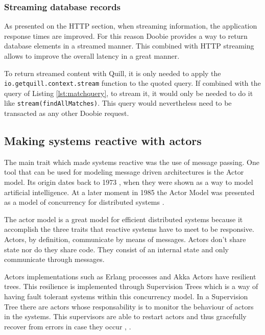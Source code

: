 \documentclass[../main.tex]{subfiles}
\begin{document}
\subsubsection{Streaming database records}
As presented on the HTTP section, when streaming information, the application
response times are improved. For this reason Doobie provides a way to return
database elements in a streamed manner. This combined with HTTP streaming allows
to improve the overall latency in a great manner.

To return streamed content with Quill, it is only needed to apply the\\
\texttt{io.getquill.context.stream} function to the quoted query. If combined
with the query of Listing \ref{lst:matchquery}, to stream it, it would only be
needed to do it like \texttt{stream(findAllMatches)}. This query would
nevertheless need to be transacted as any other Doobie request.

\subsection{Making systems reactive with actors}
The main trait which made systems reactive was the use of message passing. One
tool that can be used for modeling message driven architectures is the Actor
model. Its origin dates back to  1973 \autocite{Hewitt1973AFormalism}, when they were shown as a way to
model artificial intelligence. At a later moment in 1985 the Actor Model was
presented as a model of concurrency for distributed systems \autocite{Agha1985ACTORS:Systems}.

The
actor model is a great model for efficient distributed systems because it
accomplish the three traits that reactive systems have to meet to be responsive.
Actors, by definition, communicate by means of messages. Actors don't share state nor do they share
code. They consist of an internal state and only communicate through messages.

Actors implementations such as Erlang processes \autocite{EricssonAB2018ErlangProcesses} and Akka Actors \autocite{LightbendInc.2020AkkaActors}
have resilient trees.
This resilience is implemented through Supervision Trees which is a way of having fault tolerant systems within this
concurrency model. In a Supervision Tree there are actors whose responsability
is to monitor the behaviour of actors in the systems. This supervisors are able to
restart actors and thus gracefully recover from errors in case they occur
\autocite{ErlangBehaviour}, \autocite{SupervisionDocumentation}.
\end{document}
